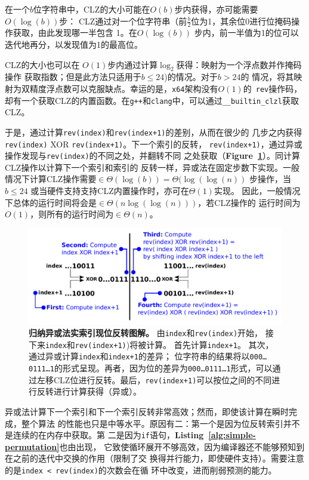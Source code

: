 \documentclass[10pt]{article}
\begin{document}
\begin{CJK*}{UTF8}{gbsn}
在一个$b$位字符串中，CLZ的大小可能在$O(b)$步内获得，亦可能需要$O(\log(b))$步：
CLZ通过对一个位字符串（前$\frac{b}{2}$位为1，其余位0进行位掩码操作获取，由此发现哪一半包含
1。在$O(\log(b))$ \cite{anderson:bit}步内，前一半值为1的位可以迭代地再分，以发现值为1的最高位。

CLZ的大小也可以在 $O(1)$步内通过计算$\log_2$获得：映射为一个浮点数并作掩码操作
获取指数；但是此方法只适用于$b \leq 24$)的情况\cite{anderson:bit}。对于$b > 24$的
情况，将其映射为双精度浮点数可以克服缺点。幸运的是，{\tt x64}架构没有$O(1)$的{\tt
rev}操作码，却有一个获取CLZ的内置函数。在{\tt g++}和{\tt clang}中，可以通过{\tt \_\_builtin\_clzl}获取CLZ。

于是，通过计算{\tt rev(index)}和{\tt rev(index+1)}的差别，从而在很少的
几步之内获得{\tt rev(index)} XOR {\tt rev(index+1)}。下一个索引的反转，
{\tt rev(index+1)}，通过异或操作发现与{\tt rev(index)}的不同之处，并翻转不同
之处获取（{\bf Figure~\ref{figure:xor}}）。同计算CLZ操作以计算下一个索引和索引的
反转一样，异或法在固定步数下实现。一般情况下计算CLZ操作需要$\in \Theta(\log(b)) = \Theta(\log(\log(n))$
步操作，当$b \leq 24$ 或当硬件支持支持CLZ内置操作时，亦可在$\Theta(1)$实现。
因此，一般情况下总体的运行时间将会是$\in \Theta(n \log(\log(n)))$，若CLZ操作的
运行时间为$O(1)$，则所有的运行时间为$\in\Theta(n)$。 

\begin{figure}
\centering
\includegraphics[width=6in]{cartoons/xor.pdf}
\caption{{\bf 归纳异或法实索引现位反转图解。} 由{\tt index}和{\tt rev(index)}开始， 接下来{\tt index}和{\tt rev(index+1)})将被计算。 首先计算{\tt index+1}。 其次，通过异或计算{\tt index}和{\tt index+1}的差异； 位字符串的结果将以{\tt 000\ldots 0111\ldots 1}的形式呈现。再者，因为位的差异为{\tt 000\ldots 0111\ldots 1}形式，可以通过左移CLZ位进行反转。最后，{\tt rev(index+1)}可以按位之间的不同进行反转进行计算获得（异或）。\label{figure:xor}}
\end{figure}

异或法计算下一个索引和下一个索引反转非常高效；然而，即使该计算在瞬时完成，整个算法
的性能也只是中等水平。原因有二：第一个是因为位反转索引并不是连续的在内存中获取。第
二是因为{\tt if}语句，{\bf Listing~\ref{alg:simple-permutation}}也由出现，
它致使循环展开不够高效，因为编译器还不能够预知到在之前的迭代中交换的作用（限制了交
换得并行能力，即使硬件支持）。需要注意的是{\tt index < rev(index)}的次数会在循
环中改变，进而削弱预测的能力。


\end{CJK*}
\end{document}
